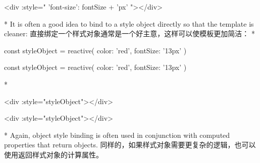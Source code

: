 \begin{paracol}{2}
\switchcolumn
\begin{codeHtml}
<div :style="{ 'font-size': fontSize + 'px' }"></div>
\end{codeHtml}
\switchcolumn[0]*%
It is often a good idea to bind to a style object directly so that the
template is cleaner:
\switchcolumn
直接绑定一个样式对象通常是一个好主意，这样可以使模板更加简洁：
\switchcolumn[0]*%
\begin{codeJs}
const styleObject = reactive({
    color: 'red',
    fontSize: '13px'
})
\end{codeJs}
\switchcolumn
\begin{codeJs}
const styleObject = reactive({
    color: 'red',
    fontSize: '13px'
})
\end{codeJs}
\switchcolumn[0]*%
\begin{codeHtml}
<div :style="styleObject"></div>
\end{codeHtml}
\switchcolumn
\begin{codeHtml}
<div :style="styleObject"></div>
\end{codeHtml}
\switchcolumn[0]*%
Again, object style binding is often used in conjunction with computed
properties that return objects.
\switchcolumn
同样的，如果样式对象需要更复杂的逻辑，也可以使用返回样式对象的计算属性。
\end{paracol}
